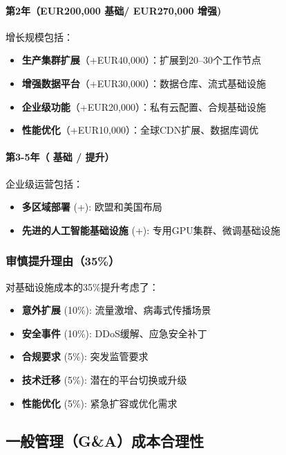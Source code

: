 \documentclass[11点, A4纸, 单面]{article}
\begin{document}
\paragraph{第2年（EUR{200{,}000} 基础/ EUR{270{,}000} 增强)}
增长规模包括：
\begin{itemize}
    \item \textbf{生产集群扩展}（+EUR{40{,}000}）：扩展到20--30个工作节点
    \item \textbf{增强数据平台}（+EUR{30{,}000}）：数据仓库、流式基础设施
    \item \textbf{企业级功能}（+EUR{20{,}000}）：私有云配置、合规基础设施
    \item \textbf{性能优化}（+EUR{10{,}000}）：全球CDN扩展、数据库调优



\end{itemize}

\paragraph{第3-5年（ 基础 /  提升）}
企业级运营包括：
\begin{itemize}
    \item \textbf{多区域部署} (+): 欧盟和美国布局
    \item \textbf{先进的人工智能基础设施} (+): 专用GPU集群、微调基础设施
\end{itemize}

\subsubsection{审慎提升理由（35\%）}
对基础设施成本的35\%提升考虑了：
\begin{itemize}
    \item \textbf{意外扩展} (10\%): 流量激增、病毒式传播场景
    \item \textbf{安全事件} (10\%): DDoS缓解、应急安全补丁
    \item \textbf{合规要求} (5\%): 突发监管要求
    \item \textbf{技术迁移} (5\%): 潜在的平台切换或升级
    \item \textbf{性能优化} (5\%): 紧急扩容或优化需求
\end{itemize}

\subsection{一般管理（G\&A）成本合理性}
\end{document}
